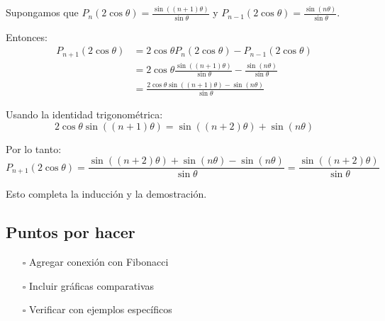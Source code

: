 Supongamos que $P_n(2\cos\theta) = \frac{\sin((n+1)\theta)}{\sin\theta}$ y $P_{n-1}(2\cos\theta) = \frac{\sin(n\theta)}{\sin\theta}$.

Entonces:
\begin{align}
P_{n+1}(2\cos\theta) &= 2\cos\theta P_n(2\cos\theta) - P_{n-1}(2\cos\theta) \\
&= 2\cos\theta \frac{\sin((n+1)\theta)}{\sin\theta} - \frac{\sin(n\theta)}{\sin\theta} \\
&= \frac{2\cos\theta \sin((n+1)\theta) - \sin(n\theta)}{\sin\theta}
\end{align}

Usando la identidad trigonométrica:
\[
    2\cos\theta \sin((n+1)\theta) = \sin((n+2)\theta) + \sin(n\theta)
\]

Por lo tanto:
\[
    P_{n+1}(2\cos\theta) = \frac{\sin((n+2)\theta) + \sin(n\theta) - \sin(n\theta)}{\sin\theta} = \frac{\sin((n+2)\theta)}{\sin\theta}
\]

Esto completa la inducción y la demostración.

\subsection{Puntos por hacer}
\begin{itemize}
  \item[$\square$] Agregar conexión con Fibonacci
  \item[$\square$] Incluir gráficas comparativas
  \item[$\square$] Verificar con ejemplos específicos
\end{itemize}
